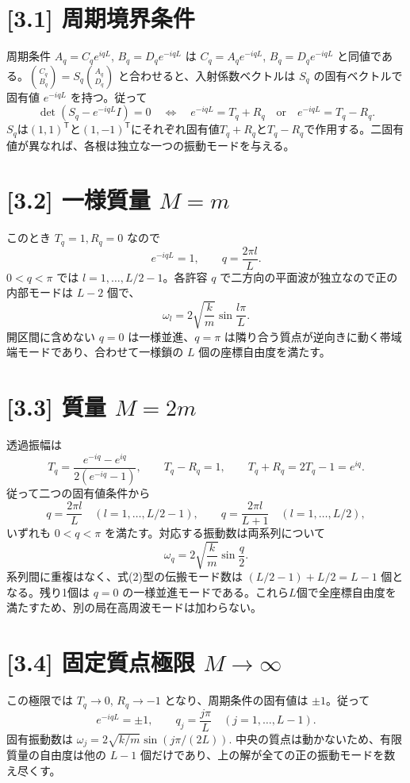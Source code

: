 \documentclass[11pt,a4paper]{article}
\begin{document}
\section*{[3.1] 周期境界条件}
周期条件 $A_q=C_qe^{iqL}$, $B_q=D_qe^{-iqL}$ は $C_q=A_qe^{-iqL}$, $B_q=D_qe^{-iqL}$ と同値である。$\binom{C_q}{B_q}=S_q\binom{A_q}{D_q}$ と合わせると、入射係数ベクトルは $S_q$ の固有ベクトルで固有値 $e^{-iqL}$ を持つ。従って
\[
\det(S_q-e^{-iqL}I)=0
\quad\Longleftrightarrow\quad
\boxed{e^{-iqL}=T_q+R_q\quad\text{or}\quad e^{-iqL}=T_q-R_q}.
\]
$S_q$は$(1,1)^{\mathsf T}$と$(1,-1)^{\mathsf T}$にそれぞれ固有値$T_q+R_q$と$T_q-R_q$で作用する。二固有値が異なれば、各根は独立な一つの振動モードを与える。

\section*{[3.2] 一様質量 $M=m$}
このとき $T_q=1,R_q=0$ なので
\[
e^{-iqL}=1,\qquad \boxed{q=\frac{2\pi l}{L}}.
\]
$0<q<\pi$ では $l=1,\ldots,L/2-1$。各許容 $q$ で二方向の平面波が独立なので正の内部モードは $L-2$ 個で、
\[
\boxed{\omega_l=2\sqrt{\frac{k}{m}}\sin\frac{l\pi}{L}}.
\]
開区間に含めない $q=0$ は一様並進、$q=\pi$ は隣り合う質点が逆向きに動く帯域端モードであり、合わせて一様鎖の $L$ 個の座標自由度を満たす。

\section*{[3.3] 質量 $M=2m$}
透過振幅は
\[
T_q=\frac{e^{-iq}-e^{iq}}{2(e^{-iq}-1)},\qquad T_q-R_q=1,\qquad T_q+R_q=2T_q-1=e^{iq}.
\]
従って二つの固有値条件から
\[
q=\frac{2\pi l}{L}\quad(l=1,\ldots,L/2-1),\qquad
q=\frac{2\pi l}{L+1}\quad(l=1,\ldots,L/2),
\]
いずれも $0<q<\pi$ を満たす。対応する振動数は両系列について
\[
\boxed{\omega_q=2\sqrt{\frac{k}{m}}\sin\frac q2}.
\]
系列間に重複はなく、式(2)型の伝搬モード数は $(L/2-1)+L/2=L-1$ 個となる。残り1個は $q=0$ の一様並進モードである。これら$L$個で全座標自由度を満たすため、別の局在高周波モードは加わらない。

\section*{[3.4] 固定質点極限 $M\to\infty$}
この極限では $T_q\to0$, $R_q\to-1$ となり、周期条件の固有値は $\pm1$。従って
\[
e^{-iqL}=\pm1,\qquad \boxed{q_j=\frac{j\pi}{L}\quad(j=1,\ldots,L-1)}.
\]
固有振動数は $\boxed{\omega_j=2\sqrt{k/m}\sin(j\pi/(2L))}$. 中央の質点は動かないため、有限質量の自由度は他の $L-1$ 個だけであり、上の解が全ての正の振動モードを数え尽くす。
\end{document}
